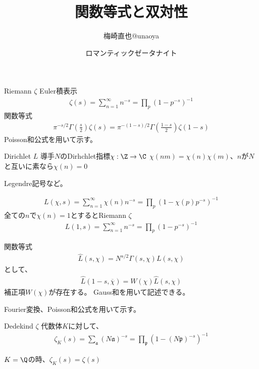 \documentclass[dvipdfmx]{beamer}
\title{関数等式と双対性}
\author{梅崎直也@unaoya}
\date{ロマンティックゼータナイト}
\begin{document}
\begin{frame}
\maketitle
\end{frame}

\begin{frame}{Riemann $\zeta$}
  Euler積表示
  \begin{align*}
    \zeta(s)=\sum^{\infty}_{n=1}n^{-s}=\prod_p(1-p^{-s})^{-1}
  \end{align*}
  関数等式
  \begin{align*}
    \pi^{-s/2}\Gamma(\frac{s}{2})\zeta(s)=\pi^{-(1-s)/2}\Gamma(\frac{1-s}{2})\zeta(1-s)
  \end{align*}
  Poisson和公式を用いて示す。
\end{frame}

\begin{frame}{Dirichlet $L$}
  導手$N$のDirhchlet指標$\chi:\Z\to\C$
  $\chi(nm)=\chi(n)\chi(m)$、$n$が$N$と互いに素なら$\chi(n)=0$

  Legendre記号など。
  
  \begin{align*}
    L(\chi,s)=\sum^{\infty}_{n=1}\chi(n)n^{-s}=\prod_p(1-\chi(p)p^{-s})^{-1}
  \end{align*}
  全ての$n$で$\chi(n)=1$とするとRiemann $\zeta$
  \begin{align*}
    L(1,s)=\sum^{\infty}_{n=1}n^{-s}=\prod_p(1-p^{-s})^{-1}
  \end{align*}
\end{frame}

\begin{frame}{関数等式}
  \begin{align*}
    \hat{L}(s,\chi)=N^{s/2}\Gamma(s,\chi)L(s,\chi)
  \end{align*}
  として、
  \begin{align*}
    \hat{L}(1-s,\overline{\chi})=W(\chi)\hat{L}(s,\chi)
  \end{align*}
  補正項$W(\chi)$が存在する。
  Gauss和を用いて記述できる。

  Fourier変換、Poisson和公式を用いて示す。
\end{frame}

\begin{frame}{Dedekind $\zeta$}
  代数体$K$に対して、
  \begin{align*}
    \zeta_K(s)=\sum_{\mathfrak{a}}(N\mathfrak{a})^{-s}=\prod_\mathfrak{p}(1-(N\mathfrak{p})^{-s})^{-1}
  \end{align*}


  $K=\Q$の時、$\zeta_K(s)=\zeta(s)$
\end{frame}
\end{document}
